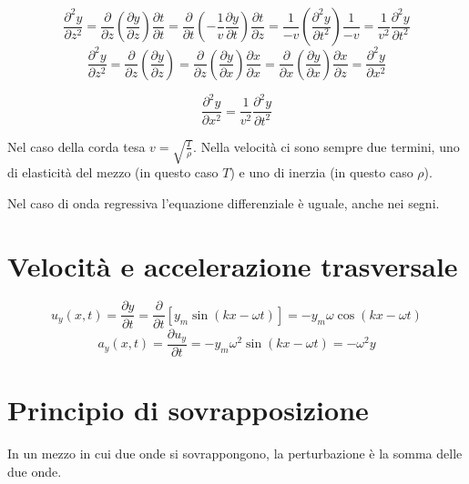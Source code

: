 \begin{equation*}\frac{\partial^2 y}{\partial z^2}=\frac{\partial}{\partial z}\left(\frac{\partial y}{\partial z}\right)\frac{\partial t}{\partial t}=\frac{\partial}{\partial t}\left(-\frac{1}{v}\frac{\partial y}{\partial t}\right)\frac{\partial t}{\partial z}=\frac{1}{-v}\left(\frac{\partial^2 y}{\partial t^2}\right)\frac{1}{-v}=\frac{1}{v^2}\frac{\partial^2 y}{\partial t^2}\end{equation*}
\begin{equation*}\frac{\partial^2 y}{\partial z^2}=\frac{\partial}{\partial z}\left(\frac{\partial y}{\partial z}\right)=\frac{\partial}{\partial z}\left(\frac{\partial y}{\partial x}\right)\frac{\partial x}{\partial x}=\frac{\partial}{\partial x}\left(\frac{\partial y}{\partial x}\right)\frac{\partial x}{\partial z}=\frac{\partial^2 y}{\partial x^2}\end{equation*}

\begin{equation}
\frac{\partial^2 y}{\partial x^2}=\frac{1}{v^2}\frac{\partial^2 y}{\partial t^2}
\end{equation}

Nel caso della corda tesa $v=\sqrt{\frac{T}{\rho}}$. Nella velocità ci sono sempre due termini, uno di elasticità del mezzo (in questo caso $T$) e uno di inerzia (in questo caso $\rho$).

Nel caso di onda regressiva l'equazione differenziale è uguale, anche nei segni.
\section{Velocità e accelerazione trasversale}
\begin{equation*}u_y(x,t)=\frac{\partial y}{\partial t}=\frac{\partial}{\partial t}\left[y_m\sin\left(kx-\omega t\right)\right]=-y_m\omega\cos\left(kx-\omega t\right)\end{equation*}
\begin{equation*}a_y(x,t)=\frac{\partial u_y}{\partial t}=-y_m\omega^2\sin\left(kx-\omega t\right)=-\omega^2 y\end{equation*}
\section{Principio di sovrapposizione}
\begin{Pri}[sovrapposizione]
In un mezzo in cui due onde si sovrappongono, la perturbazione è la somma delle due onde.
\end{Pri}
